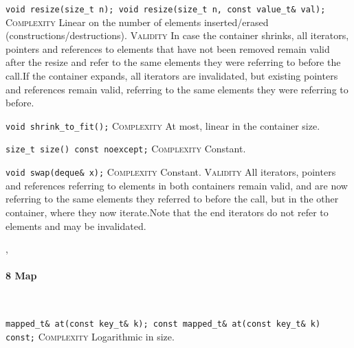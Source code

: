 \noindent{}\hspace*{0.25em}\lstinline[basicstyle=\ttfamily\color{corange}]{void resize(size_t n); void resize(size_t n, const value_t& val);} \textsc{Complexity} Linear on the number of elements inserted/erased (constructions/destructions). \textsc{Validity} In case the container shrinks, all iterators, pointers and references to elements that have not been removed remain valid after the resize and refer to the same elements they were referring to before the call.If the container expands, all iterators are invalidated, but existing pointers and references remain valid, referring to the same elements they were referring to before.\\\vspace{-0.6em}

\noindent{}\hspace*{0.25em}\lstinline[basicstyle=\ttfamily\color{corange}]{void shrink_to_fit();} \textsc{Complexity} At most, linear in the container size.\\\vspace{-0.6em}

\noindent{}\hspace*{0.25em}\lstinline[basicstyle=\ttfamily\color{cgreen}]{size_t size() const noexcept;} \textsc{Complexity} Constant.\\\vspace{-0.6em}

\noindent{}\hspace*{0.25em}\lstinline[basicstyle=\ttfamily\color{cgreen}]{void swap(deque& x);} \textsc{Complexity} Constant. \textsc{Validity} All iterators, pointers and references referring to elements in both containers remain valid, and are now referring to the same elements they referred to before the call, but in the other container, where they now iterate.Note that the end iterators do not refer to elements and may be invalidated.\\\vspace{-0.6em}


\sep
{}
\paragraph{8 Map}\mbox{}\vspace{0.5em}\\
\noindent{}\hspace*{0.25em}\lstinline[basicstyle=\ttfamily\color{clime}]{mapped_t& at(const key_t& k); const mapped_t& at(const key_t& k) const;} \textsc{Complexity} Logarithmic in size.\\\vspace{-0.6em}

